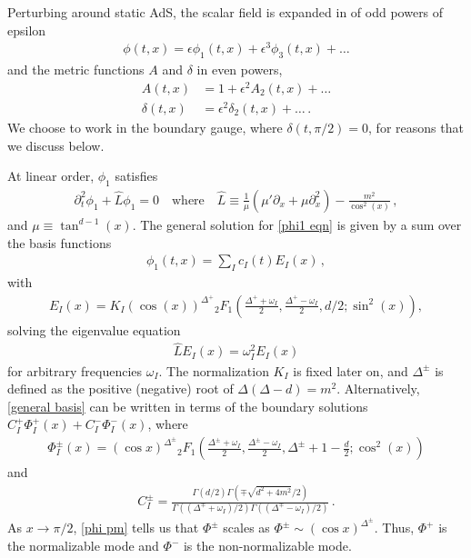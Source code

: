 \documentclass[letterpaper,11pt]{article}
\newcommand{\p}{\partial}
\begin{document}
Perturbing around static AdS, the scalar field is expanded in of odd powers of epsilon 
\begin{align}
\phi(t,x) = \epsilon \phi_1(t,x) + \epsilon^3 \phi_3 (t,x) + \ldots
\end{align}
and the metric functions $A$ and $\delta$ in even powers,
\begin{align}
A(t, x) &= 1 + \epsilon^2 A_2 (t,x) + \ldots \\
\delta(t, x) &= \epsilon^2 \delta_2 (t,x)+ \ldots \, .
\end{align}
We choose to work in the boundary gauge, where $\delta(t, \pi/2) = 0$, for reasons that we discuss below.

At linear order, $\phi_1$ satisfies
\begin{align}
\label{phi1 eqn}
\p^2_t \phi_1 + \hat L \phi_1 = 0 \quad \text{where} \quad \hat{L} \equiv \frac{1}{\mu} (\mu' \p_x + \mu \p^2_x)  - \frac{m^2}{\cos^2(x)} \, ,
\end{align}
and $\mu \equiv \tan^{d-1}(x)$. The general solution for \eqref{phi1 eqn} is given by a sum over the basis functions 
\begin{align}
\phi_1 (t,x) = \sum_I c_I (t) E_I (x) \, ,
\end{align}
with \cite{Nastase}
\begin{align}
\label{general basis}
E_I (x) =  K_I \left( \cos(x) \right)^{\Delta^+} {_2F_1} \left(\frac{\Delta^+ + \omega_I}{2}, \frac{\Delta^+ - \omega_I}{2}, d/2 ; \sin^2 (x) \right) ,
\end{align}
solving the eigenvalue equation
\begin{align}
\label{eigen eqn}
\hat L E_I (x) = \omega_I^2 E_I (x)
\end{align}
for arbitrary frequencies $\omega_I$. The normalization $K_I$ is fixed later on, and $\Delta^\pm$ is defined as the positive (negative) root of $\Delta ( \Delta - d ) = m^2$. Alternatively, \eqref{general basis} can be written in terms of the boundary solutions ${C^+_I \Phi^+_I (x) + C^- _I \Phi^-_I (x)}$, where
\begin{align}
\label{phi pm}
\Phi^\pm_I (x) = \left( \cos x \right)^{\Delta^\pm} {_2F_1}\left( \frac{\Delta^\pm + \omega_I}{2}, \frac{\Delta^\pm - \omega_I}{2}, \Delta^\pm +1 - \frac{d}{2} ; \cos^2 (x) \right)
\end{align}
and
\begin{align}
C^\pm_I = \frac{\Gamma(d/2) \Gamma(\mp \sqrt{d^2 + 4m^2} / 2)}{\Gamma \left( (\Delta^{\mp} + \omega_I)/2 \right) \Gamma \left( (\Delta^\mp - \omega_I)/2 \right)} \, .
\end{align}
As $x \to \pi/2$, \eqref{phi pm} tells us that $\Phi^\pm$ scales as $\Phi^\pm \sim ( \cos x )^{\Delta^{\pm}}$. Thus, $\Phi^+$ is the normalizable mode and $\Phi^-$ is the non-normalizable mode.
\end{document}

